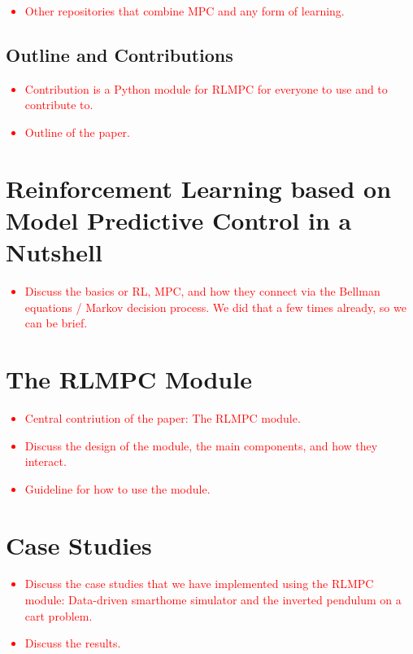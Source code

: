 \documentclass{ifacconf}
\begin{document}
\textcolor{red}{
   \begin{itemize}
      \item Other repositories that combine MPC and any form of learning.
   \end{itemize}
}

\subsection{Outline and Contributions}

\textcolor{red}{
   \begin{itemize}
      \item Contribution is a Python module for RLMPC for everyone to use and to contribute to.
      \item Outline of the paper.
   \end{itemize}
}

\section{Reinforcement Learning based on Model Predictive Control in a Nutshell}

\textcolor{red}{
   \begin{itemize}
      \item Discuss the basics or RL, MPC, and how they connect via the Bellman equations / Markov decision process. We did that a few times already, so we can be brief.
   \end{itemize}
}

\section{The RLMPC Module}

\textcolor{red}{
   \begin{itemize}
      \item Central contriution of the paper: The RLMPC module.
      \item Discuss the design of the module, the main components, and how they interact.
      \item Guideline for how to use the module.
   \end{itemize}
}

\section{Case Studies}

\textcolor{red}{
   \begin{itemize}
      \item Discuss the case studies that we have implemented using the RLMPC module: Data-driven smarthome simulator and the inverted pendulum on a cart problem.
      \item Discuss the results.
   \end{itemize}
}
\end{document}
